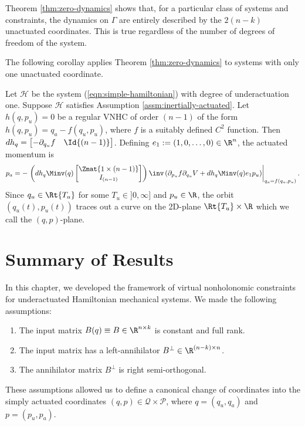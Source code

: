 Theorem \ref{thm:zero-dynamics} shows that, for a particular class of systems
and constraints, the dynamics on \(\Gamma\) are entirely described by the \(2(n-k)\)
unactuated coordinates.
This is true regardless of the number of degrees of freedom of the system.

The following corollay applies Theorem \ref{thm:zero-dynamics} to
systems with only one unactuated coordinate.

\begin{cor}\label{cor:2d-zero-dynamics}
    Let \(\mathcal{H}\) be the system (\ref{eqn:simple-hamiltonian}) with degree
    of underactuation one.
    Suppose \(\mathcal{H}\) satisfies Assumption \ref{assm:inertially-actuated}.
    Let \(h(q,p_u) = 0\) be a regular VNHC of order \((n-1)\) of the form
    \(h(q,p_u) = q_a - f(q_u,p_u)\),
    where \(f\) is a suitably defined \(C^2\) function.
    Then \(dh_q = \begin{bmatrix} -\partial_{q_u}f & \Id{(n-1)}
    \end{bmatrix}\).
    Defining \(e_1 := (1,0,\ldots,0) \in \R^n\), the actuated momentum is
    \begin{equation}\label{eqn:g-qupu}
        p_a = -\left.\left(dh_q \Minv(q)
        \begin{bmatrix}
            \Zmat{1\times (n-1)}\\
            I_{(n-1)}
        \end{bmatrix}\right)\inv 
        \left(\partial_{p_u}f \partial_{q_u}V + dh_q \Minv(q)e_1 p_u\right) 
            \right|_{q_a =f(q_u,p_u)}
        .
    \end{equation}
    Since \(q_u \in \Rt{T_u}\) for some \(T_u \in ]0,\infty]\) and \(p_u \in \R\),
    the orbit \((q_u(t),p_u(t))\) traces out
    a curve on the 2D-plane \(\Rt{T_u} \times \R\) which we call the \((q,p)\)-plane.
\end{cor}

\section{Summary of Results}
In this chapter, we developed the framework of virtual nonholonomic constraints
for underactuated Hamiltonian mechanical systems.
We made the following assumptions:
\begin{enumerate}
    \item The input matrix \(B(q) \equiv B \in \R^{n \times k}\) is constant and
        full rank.
    \item The input matrix has a left-annihilator 
        \(B^\perp \in \R^{(n-k)\times n}\). 
    \item The annihilator matrix \(B^\perp\) is right semi-orthogonal.
\end{enumerate}
These assumptions allowed us to define a canonical change of coordinates
into the simply actuated coordinates 
\((q,p) \in \mathcal{Q} \times \mathcal{P}\),
where \(q = (q_u,q_a)\) and \(p = (p_u,p_a)\).

